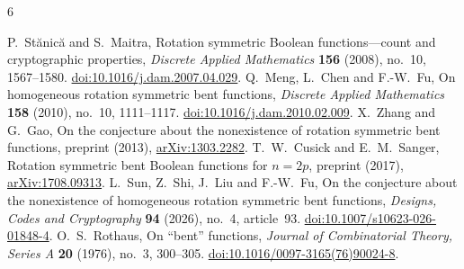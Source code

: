 \documentclass[11pt,reqno]{amsart}
\begin{document}
\begin{thebibliography}{6}
\raggedright
{} P.~St\u{a}nic\u{a} and S.~Maitra, Rotation symmetric Boolean functions---count and cryptographic properties, \emph{Discrete Applied Mathematics} \textbf{156} (2008), no.~10, 1567--1580. \href{https://doi.org/10.1016/j.dam.2007.04.029}{doi:10.1016/j.dam.2007.04.029}.
 Q.~Meng, L.~Chen and F.-W.~Fu, On homogeneous rotation symmetric bent functions, \emph{Discrete Applied Mathematics} \textbf{158} (2010), no.~10, 1111--1117. \href{https://doi.org/10.1016/j.dam.2010.02.009}{doi:10.1016/j.dam.2010.02.009}.
 X.~Zhang and G.~Gao, On the conjecture about the nonexistence of rotation symmetric bent functions, preprint (2013), \href{https://arxiv.org/abs/1303.2282}{arXiv:1303.2282}.
 T.~W.~Cusick and E.~M.~Sanger, Rotation symmetric bent Boolean functions for $n=2p$, preprint (2017), \href{https://arxiv.org/abs/1708.09313}{arXiv:1708.09313}.
 L.~Sun, Z.~Shi, J.~Liu and F.-W.~Fu, On the conjecture about the nonexistence of homogeneous rotation symmetric bent functions, \emph{Designs, Codes and Cryptography} \textbf{94} (2026), no.~4, article~93. \href{https://doi.org/10.1007/s10623-026-01848-4}{doi:10.1007/s10623-026-01848-4}.
 O.~S.~Rothaus, On ``bent'' functions, \emph{Journal of Combinatorial Theory, Series A} \textbf{20} (1976), no.~3, 300--305. \href{https://doi.org/10.1016/0097-3165(76)90024-8}{doi:10.1016/0097-3165(76)90024-8}.
\end{thebibliography}
\end{document}
